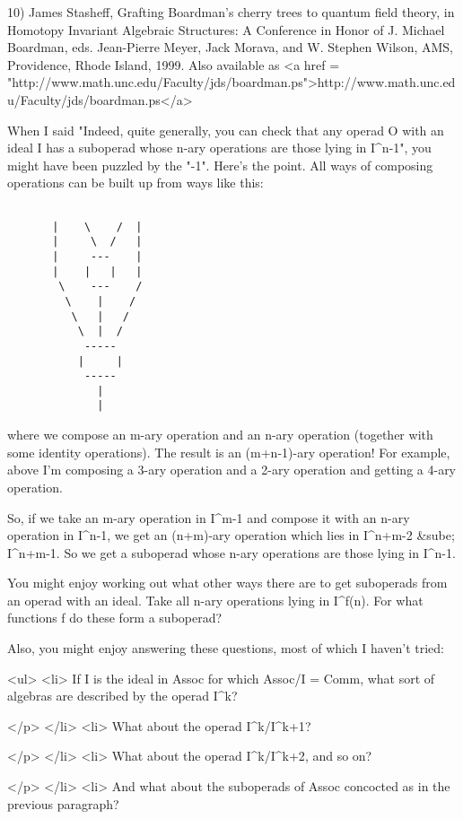 10) James Stasheff, Grafting Boardman's cherry trees to quantum field
theory, in Homotopy Invariant Algebraic Structures: A Conference in
Honor of J. Michael Boardman, eds. Jean-Pierre Meyer, Jack
Morava, and W. Stephen Wilson, AMS, Providence, Rhode Island, 1999.
Also available as <a href = "http://www.math.unc.edu/Faculty/jds/boardman.ps">http://www.math.unc.edu/Faculty/jds/boardman.ps</a>

When I said "Indeed, quite generally, you can check that any operad O
with an ideal I has a suboperad whose n-ary operations are those lying
in I^{n-1}", you might have been puzzled by the "-1".  Here's the
point.  All ways of composing operations can be built up from ways like
this:


\begin{verbatim}

       |    \    /  |
       |     \  /   |
       |     ---    |
       |    |   |   | 
        \    ---    /
         \    |    /
          \   |   /  
           \  |  / 
            ----- 
           |     |  
            -----  
              |   
              |  
\end{verbatim}
    

where we compose an m-ary operation and an n-ary operation (together
with some identity operations).  The result is an (m+n-1)-ary operation!
For example, above I'm composing a 3-ary operation and a 2-ary operation
and getting a 4-ary operation.  

So, if we take an m-ary operation in I^{m-1} and compose it with an
n-ary operation in I^{n-1}, we get an (n+m)-ary operation which lies 
in I^{n+m-2} &sube; I^{n+m-1}.    So we get
a suboperad whose n-ary operations are those lying in I^{n-1}.

You might enjoy working out what other ways there are to get
suboperads from an operad with an ideal.  Take all n-ary operations
lying in I^{f(n)}.  For what functions f do these form a
suboperad?

Also, you might enjoy answering these questions, most of which
I haven't tried:

<ul>
<li>  If I is the ideal in
Assoc for which Assoc/I = Comm, what sort of algebras are described by
the operad I^{k}?  

</p>
</li>
<li>
What about the operad I^{k}/I^{k+1}?  

</p>
</li>
<li>
What about the operad I^{k}/I^{k+2}, and so on?  

</p>
</li>
<li>
And what about the
suboperads of Assoc concocted as in the previous paragraph?

